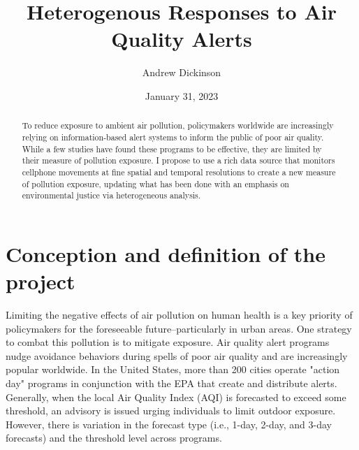 \documentclass[12pt]{article}
\title{Heterogenous Responses to Air Quality Alerts}
\author{Andrew Dickinson}
\date{January 31, 2023}
\begin{document}

\maketitle

\begin{abstract}
\noindent To reduce exposure to ambient air pollution, policymakers worldwide are increasingly relying on information-based alert systems to inform the public of poor air quality. While a few studies have found these programs to be effective, they are limited by their measure of pollution exposure. I propose to use a rich data source that monitors cellphone movements at fine spatial and temporal resolutions to create a new measure of pollution exposure, updating what has been done with an emphasis on environmental justice via heterogeneous analysis.
\end{abstract}

\newpage 

\section{Conception and definition of the project}

Limiting the negative effects of air pollution on human health is a key priority of policymakers for the foreseeable future--particularly in urban areas. One strategy to combat this pollution is to mitigate exposure. Air quality alert programs nudge avoidance behaviors during spells of poor air quality and are increasingly popular worldwide. In the United States, more than 200 cities operate "action day" programs in conjunction with the EPA that create and distribute alerts. Generally, when the local Air Quality Index (AQI) is forecasted to exceed some threshold, an advisory is issued urging individuals to limit outdoor exposure. However, there is variation in the forecast type (i.e., 1-day, 2-day, and 3-day forecasts) and the threshold level across programs. \\
\end{document}
